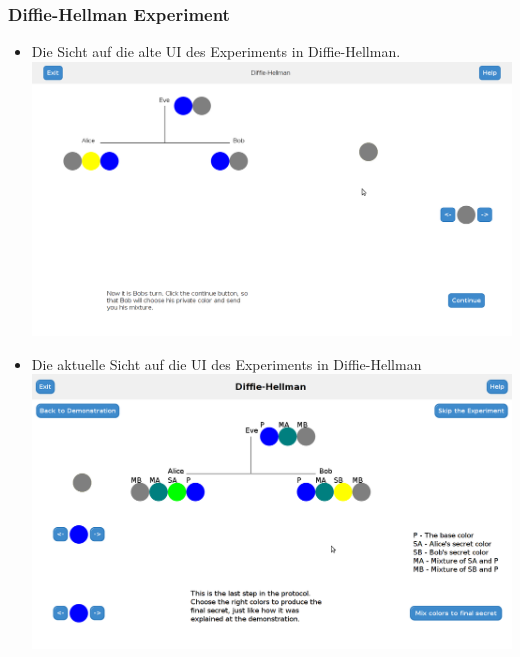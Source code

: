 \documentclass{article}
\begin{document}
    \subsubsection{Diffie-Hellman Experiment}
     \begin{itemize}
      \item Die Sicht auf die alte UI des Experiments in Diffie-Hellman.\newline
            \includegraphics[width=15cm]{resources/dhExperiment.png}
      \newpage
      \item Die aktuelle Sicht auf die UI des Experiments in Diffie-Hellman\newline
            \includegraphics[width=15cm]{resources/dhUsabilityFix.png}
     \end{itemize}
\end{document}
